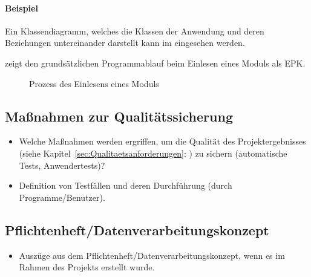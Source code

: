 \paragraph{Beispiel}
Ein Klassendiagramm, welches die Klassen der Anwendung und deren Beziehungen untereinander darstellt kann im  eingesehen werden.

 zeigt den grundsätzlichen Programmablauf beim Einlesen eines Moduls als \ac{EPK}.
\begin{figure}[htb]
\centering
{}
\caption{Prozess des Einlesens eines Moduls}
\label{fig:Modulimport}
\end{figure}


\subsection{Maßnahmen zur Qualitätssicherung}
\label{sec:Qualitaetssicherung}
\begin{itemize}
	\item Welche Maßnahmen werden ergriffen, um die Qualität des Projektergebnisses (siehe Kapitel~\ref{sec:Qualitaetsanforderungen}: ) zu sichern (\zB automatische Tests, Anwendertests)?
	\item \Ggfs Definition von Testfällen und deren Durchführung (durch Programme/Benutzer).
\end{itemize}


\subsection{Pflichtenheft/Datenverarbeitungskonzept}
\label{sec:Pflichtenheft}
\begin{itemize}
	\item Auszüge aus dem Pflichtenheft/Datenverarbeitungskonzept, wenn es im Rahmen des Projekts erstellt wurde.
\end{itemize}







